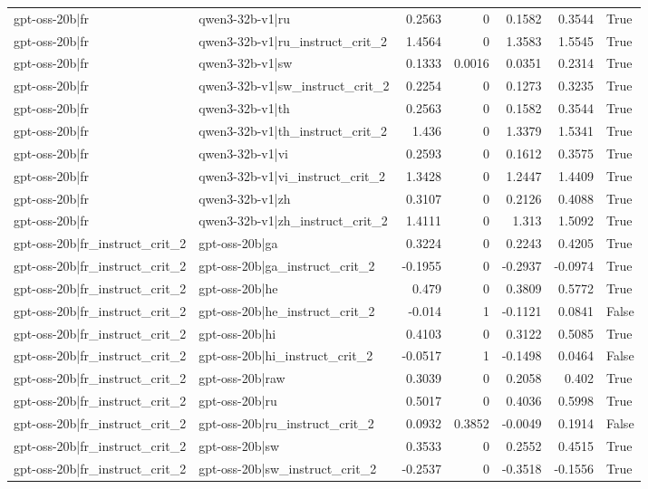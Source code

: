 \begin{table}
\begin{tabular}{l l r r r r l}
gpt-oss-20b|fr & qwen3-32b-v1|ru & 0.2563 & 0 & 0.1582 & 0.3544 & True \\
gpt-oss-20b|fr & qwen3-32b-v1|ru_instruct_crit_2 & 1.4564 & 0 & 1.3583 & 1.5545 & True \\
gpt-oss-20b|fr & qwen3-32b-v1|sw & 0.1333 & 0.0016 & 0.0351 & 0.2314 & True \\
gpt-oss-20b|fr & qwen3-32b-v1|sw_instruct_crit_2 & 0.2254 & 0 & 0.1273 & 0.3235 & True \\
gpt-oss-20b|fr & qwen3-32b-v1|th & 0.2563 & 0 & 0.1582 & 0.3544 & True \\
gpt-oss-20b|fr & qwen3-32b-v1|th_instruct_crit_2 & 1.436 & 0 & 1.3379 & 1.5341 & True \\
gpt-oss-20b|fr & qwen3-32b-v1|vi & 0.2593 & 0 & 0.1612 & 0.3575 & True \\
gpt-oss-20b|fr & qwen3-32b-v1|vi_instruct_crit_2 & 1.3428 & 0 & 1.2447 & 1.4409 & True \\
gpt-oss-20b|fr & qwen3-32b-v1|zh & 0.3107 & 0 & 0.2126 & 0.4088 & True \\
gpt-oss-20b|fr & qwen3-32b-v1|zh_instruct_crit_2 & 1.4111 & 0 & 1.313 & 1.5092 & True \\
gpt-oss-20b|fr_instruct_crit_2 & gpt-oss-20b|ga & 0.3224 & 0 & 0.2243 & 0.4205 & True \\
gpt-oss-20b|fr_instruct_crit_2 & gpt-oss-20b|ga_instruct_crit_2 & -0.1955 & 0 & -0.2937 & -0.0974 & True \\
gpt-oss-20b|fr_instruct_crit_2 & gpt-oss-20b|he & 0.479 & 0 & 0.3809 & 0.5772 & True \\
gpt-oss-20b|fr_instruct_crit_2 & gpt-oss-20b|he_instruct_crit_2 & -0.014 & 1 & -0.1121 & 0.0841 & False \\
gpt-oss-20b|fr_instruct_crit_2 & gpt-oss-20b|hi & 0.4103 & 0 & 0.3122 & 0.5085 & True \\
gpt-oss-20b|fr_instruct_crit_2 & gpt-oss-20b|hi_instruct_crit_2 & -0.0517 & 1 & -0.1498 & 0.0464 & False \\
gpt-oss-20b|fr_instruct_crit_2 & gpt-oss-20b|raw & 0.3039 & 0 & 0.2058 & 0.402 & True \\
gpt-oss-20b|fr_instruct_crit_2 & gpt-oss-20b|ru & 0.5017 & 0 & 0.4036 & 0.5998 & True \\
gpt-oss-20b|fr_instruct_crit_2 & gpt-oss-20b|ru_instruct_crit_2 & 0.0932 & 0.3852 & -0.0049 & 0.1914 & False \\
gpt-oss-20b|fr_instruct_crit_2 & gpt-oss-20b|sw & 0.3533 & 0 & 0.2552 & 0.4515 & True \\
gpt-oss-20b|fr_instruct_crit_2 & gpt-oss-20b|sw_instruct_crit_2 & -0.2537 & 0 & -0.3518 & -0.1556 & True \\

\end{tabular}
\end{table}
